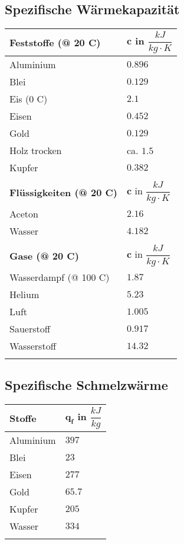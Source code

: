 	\subsection{Spezifische Wärmekapazität}
		\begin{tabular}{| p{6cm} | p{5cm} |}
			\hline
			\rowcolor{Gray}
			\textbf{Feststoffe (@ 20 \textdegree C)}	&	$\boldsymbol{c}$ in $\dfrac{kJ}{kg \cdot K}$\\
			\hline
			Aluminium & $0.896$\\
			Blei & $0.129$\\
			Eis (0 \textdegree C) & $2.1$\\
			Eisen & $0.452$\\
			Gold & $0.129$\\
			Holz trocken & ca. $1.5$\\
			Kupfer & $0.382$\\
			& \\
			\hline
			\rowcolor{Gray}
			\textbf{Flüssigkeiten (@ 20 \textdegree C)} & $\boldsymbol{c}$ in $\dfrac{kJ}{kg \cdot K}$\\
			\hline
			Aceton & $2.16$\\
			Wasser & $4.182$\\
			& \\
			\hline
			\rowcolor{Gray}
			\textbf{Gase (@ 20 \textdegree C)}	&	$\boldsymbol{c}$ in $\dfrac{kJ}{kg \cdot K}$\\
			\hline
			Wasserdampf (@ 100 \textdegree C) & $1.87$\\
			Helium & $5.23$\\
			Luft & $1.005$\\
			Sauerstoff & $0.917$\\
			Wasserstoff & $14.32$\\
			& \\
			\hline
		\end{tabular}
	
	\subsection{Spezifische Schmelzwärme}
		\begin{tabular}{| p{6cm} | p{5cm} |}
			\hline
			\rowcolor{Gray}
			\textbf{Stoffe}	&	$\boldsymbol{q_f}$ in $\dfrac{kJ}{kg}$\\
			\hline
			Aluminium & $397$\\
			Blei & $23$\\
			Eisen & $277$\\
			Gold & $65.7$\\
			Kupfer & $205$\\
			Wasser & $334$\\
			& \\
			\hline
		\end{tabular}
	
